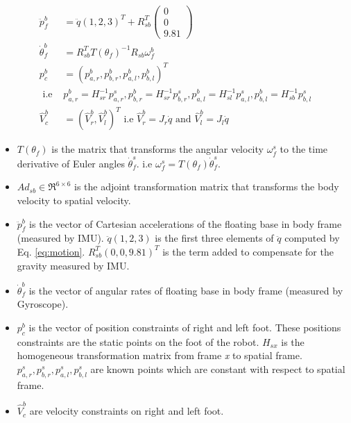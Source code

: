 \documentclass[12pt]{article}
\begin{document}
\begin{equation}
\begin{split}
	\ddot{p}_{f}^{b} &= \ddot{q}(1,2,3)^{T} + R_{sb}^{T} 
	\begin{pmatrix}
	0 \\ 0 \\ 9.81
	\end{pmatrix}\\
	\dot{\theta}_{f}^{b} &= R_{sb}^{T}T(\theta_{f})^{-1}R_{sb}\omega_{f}^{b}\\
	p_{c}^{b} &= (p_{a,r}^{b}, p_{b,r}^{b}, p_{a,l}^{b}, p_{b,l}^{b} )^{T} \\
	 \text{ i.e } &p_{a,r}^{b} = H_{sr}^{-1} p_{a,r}^{s},p_{b,r}^{b} = H_{sr}^{-1} p_{b,r}^{s},p_{a,l}^{b} = H_{sl}^{-1} p_{a,l}^{s},p_{b,l}^{b} = H_{sb}^{-1} p_{b,l}^{s}  \\
	\hat{V}_{c}^{b} &= (\hat{V}_{r}^{b},\hat{V}_{l}^{b})^{T} \text{ i.e } \hat{V}_{r}^{b} = J_{r}\dot{q} \text{ and } \hat{V}_{l}^{b} = J_{l}\dot{q}
	\end{split}
	\end{equation}
\begin{itemize}
\item $T(\theta_{f})$ is the matrix that transforms the angular velocity $\omega_{f}^{s}$ to the time derivative of Euler angles $\dot{\theta}_{f}^{s}$. i.e $\omega_{f}^{s}=T(\theta_{f}) \dot{\theta}_{f}^{s}$. 
\item $Ad_{sb} \in \Re^{6 \times 6}$ is the adjoint transformation matrix that transforms the body velocity to spatial velocity. 
\item $\ddot{p}_{f}^{b}$ is the vector of Cartesian accelerations of the floating base in body frame (measured by IMU).	$\ddot{q}(1,2,3)$ is the first three elements of $\ddot{q}$ computed by Eq. \ref{eq:motion}. $R_{sb}^{T}(0,0,9.81)^{T}$ is the term added to compensate for the gravity measured by IMU. 
\item $\dot{\theta}_{f}^{b} $ is the vector of angular rates of floating base in body frame (measured by Gyroscope). 
\item $p_{c}^{b}$ is the vector of position constraints of right and left foot. These positions constraints are the static points on the foot of the robot. $H_{sx}$ is the homogeneous transformation matrix from frame \emph{x} to spatial frame. $p_{a,r}^{s}, p_{b,r}^{s}, p_{a,l}^{s}, p_{b,l}^{s}$ are known points which are constant with respect to spatial frame.
\item $\hat{V}_{c}^{b}$ are velocity constraints on right and left foot.
\end{itemize}
\end{document}
